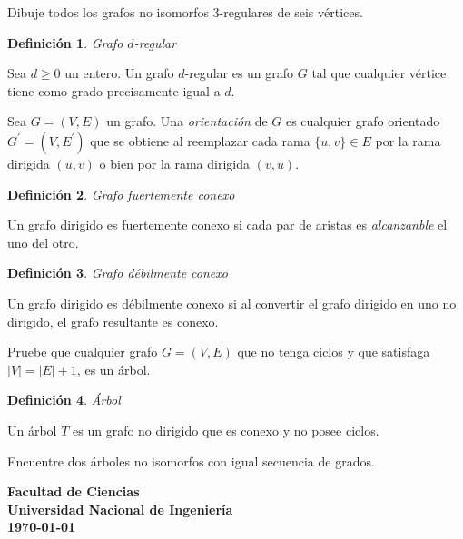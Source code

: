 \documentclass[spanish,addpoints,answers,a4paper,8pt]{exam}
\theoremstyle{definition}
\newtheorem{definition}{Definición}
\newcommand{\unmarkedfntext}[1]{%
	\begingroup
	\renewcommand\thefootnote{}\footnote{#1}%
	\addtocounter{footnote}{-1}%
	\endgroup
}
\begin{document}
\begin{questions}
    \question[5] Dibuje todos los grafos no isomorfos $3$-regulares de seis vértices.

    \begin{definition}{\em Grafo $d$-regular}

        Sea $d\geq0$ un entero. Un grafo $d$-regular es un grafo $G$ tal que cualquier vértice tiene como grado precisamente igual a $d$.
    \end{definition}

    \question Sea $G=(V,E)$ un grafo. Una \emph{orientación} de $G$ es cualquier grafo orientado $G^{\prime}=(V,E^{\prime})$ que se obtiene al reemplazar cada rama $\{u,v\}\in E$ por la rama dirigida $(u,v)$ o bien por la rama dirigida $(v,u)$.

    \begin{definition}{\em Grafo fuertemente conexo}

        Un grafo dirigido es fuertemente conexo si cada par de aristas es \emph{alcanzanble} el uno del otro.
    \end{definition}

    \begin{definition}{\em Grafo débilmente conexo}

        Un grafo dirigido es débilmente conexo si al convertir el grafo dirigido en uno no dirigido, el grafo resultante es conexo.
    \end{definition}
    \question[5] Pruebe que cualquier grafo $G=(V,E)$ que no tenga ciclos y que satisfaga $|V|=|E|+1$, es un árbol.

    \begin{definition}{\em Árbol}

        Un árbol $T$ es un grafo no dirigido que es conexo y no posee ciclos.
    \end{definition}

    \question[5] Encuentre dos árboles no isomorfos con igual secuencia de grados.
\end{questions}
\vfill
\begin{flushright}\bfseries
    Facultad de Ciencias\\[2mm]
    Universidad Nacional de Ingeniería\\[2mm]
    \today%
\end{flushright}
\end{document}
